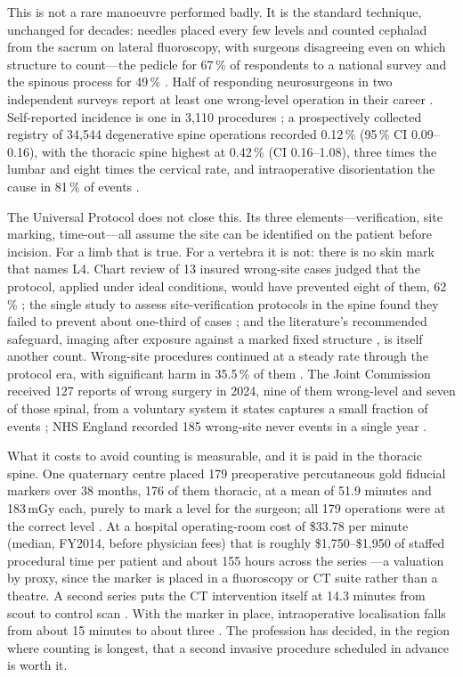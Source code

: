 \documentclass[11pt,letterpaper]{article}
\begin{document}
This is not a rare manoeuvre performed badly. It is the standard technique, unchanged for decades: needles
placed every few levels and counted cephalad from the sacrum on lateral fluoroscopy, with surgeons
disagreeing even on which structure to count---the pedicle for 67\,\% of respondents to a national survey
and the spinous process for 49\,\% \citep{strong2021,mayer2008}. Half of responding neurosurgeons in two
independent surveys report at least one wrong-level operation in their career \citep{mody2008,groff2013}.
Self-reported incidence is one in 3{,}110 procedures \citep{mody2008}; a prospectively collected registry
of 34{,}544 degenerative spine operations recorded 0.12\,\% (95\,\% CI 0.09--0.16), with the thoracic spine
highest at 0.42\,\% (CI 0.16--1.08), three times the lumbar and eight times the cervical rate, and
intraoperative disorientation the cause in 81\,\% of events \citep{furuya2026}.

The Universal Protocol does not close this. Its three elements---verification, site marking, time-out---all
assume the site can be identified on the patient before incision. For a limb that is true. For a vertebra
it is not: there is no skin mark that names L4. Chart review of 13 insured wrong-site cases judged that the
protocol, applied under ideal conditions, would have prevented eight of them, 62\,\% \citep{kwaan2006}; the
single study to assess site-verification protocols in the spine found they failed to prevent about
one-third of cases \citep{longo2012}; and the literature's recommended safeguard, imaging after exposure
against a marked fixed structure \citep{devine2010}, is itself another count. Wrong-site procedures
continued at a steady rate through the protocol era, with significant harm in 35.5\,\% of them
\citep{stahel2010}. The Joint Commission received 127 reports of wrong surgery in 2024, nine of them
wrong-level and seven of those spinal, from a voluntary system it states captures a small fraction of
events \citep{jc2024}; NHS England recorded 185 wrong-site never events in a single year \citep{nhse2025}.

What it costs to avoid counting is measurable, and it is paid in the thoracic spine. One quaternary centre
placed 179 preoperative percutaneous gold fiducial markers over 38 months, 176 of them thoracic, at a mean
of 51.9 minutes and 183\,mGy each, purely to mark a level for the surgeon; all 179 operations were at the
correct level \citep{siminski2023}. At a hospital operating-room cost of \$33.78 per minute (median,
FY2014, before physician fees) that is roughly \$1{,}750--\$1{,}950 of staffed procedural time per patient
and about 155 hours across the series \citep{childers2018}---a valuation by proxy, since the marker is
placed in a fluoroscopy or CT suite rather than a theatre. A second series puts the CT intervention itself
at 14.3 minutes from scout to control scan \citep{keil2024}. With the marker in place, intraoperative
localisation falls from about 15 minutes to about three \citep{mongardi2021,upadhyaya2012}. The profession
has decided, in the region where counting is longest, that a second invasive procedure scheduled in advance
is worth it.
\end{document}

